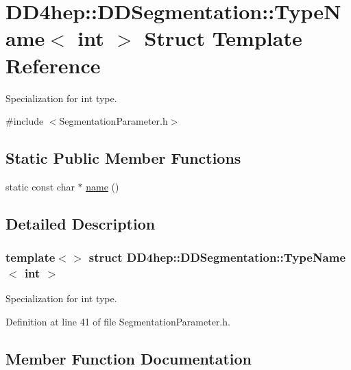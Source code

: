 \hypertarget{struct_d_d4hep_1_1_d_d_segmentation_1_1_type_name_3_01int_01_4}{}\section{D\+D4hep\+:\+:D\+D\+Segmentation\+:\+:Type\+Name$<$ int $>$ Struct Template Reference}
\label{struct_d_d4hep_1_1_d_d_segmentation_1_1_type_name_3_01int_01_4}


Specialization for int type.  




{\ttfamily \#include $<$Segmentation\+Parameter.\+h$>$}

\subsection*{Static Public Member Functions}
\begin{DoxyCompactItemize}
\item 
static const char $\ast$ \hyperlink{struct_d_d4hep_1_1_d_d_segmentation_1_1_type_name_3_01int_01_4_a723ff39181d093b9b3e07c7dbb726450}{name} ()
\end{DoxyCompactItemize}


\subsection{Detailed Description}
\subsubsection*{template$<$$>$\newline
struct D\+D4hep\+::\+D\+D\+Segmentation\+::\+Type\+Name$<$ int $>$}

Specialization for int type. 

Definition at line 41 of file Segmentation\+Parameter.\+h.



\subsection{Member Function Documentation}
\hypertarget{struct_d_d4hep_1_1_d_d_segmentation_1_1_type_name_3_01int_01_4_a723ff39181d093b9b3e07c7dbb726450}{}\label{struct_d_d4hep_1_1_d_d_segmentation_1_1_type_name_3_01int_01_4_a723ff39181d093b9b3e07c7dbb726450} 
